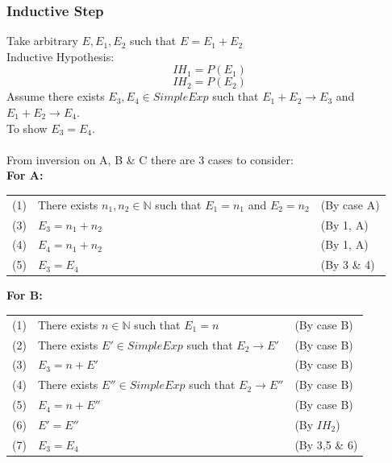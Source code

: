 \subsubsection{Inductive Step}
Take arbitrary $E, E_1,E_2$ such that $E = E_1 + E_2$
\\ Inductive Hypothesis:
\[IH_1 = P(E_1)\]
\[IH_2 = P(E_2)\]
Assume there exists $E_3, E_4 \in SimpleExp$ such that $E_1 + E_2 \to E_3$ and $E_1 + E_2 \to E_4$.
\\ To show $E_3 = E_4$.
\\
\\ From inversion on A, B \& C there are 3 cases to consider:
\\ \textbf{For A:}
\begin{center}
	\begin{tabular}{l l l}
		(1) & There exists $n_1, n_2 \in \mathbb{N}$ such that $E_1 = n_1$ and $E_2 = n_2$ & (By case A) \\
		(3) & $E_3 = n_1 + n_2$                                                            & (By 1, A)   \\
		(4) & $E_4 = n_1 + n_2$                                                            & (By 1, A)   \\
		(5) & $E_3 = E_4$                                                                  & (By 3 \& 4) \\
	\end{tabular}
\end{center}
\textbf{For B:}
\begin{center}
	\begin{tabular}{l l l}
		(1) & There exists $n \in \mathbb{N}$ such that $E_1 = n$      & (By case B)   \\
		(2) & There exists $E' \in SimpleExp$ such that $E_2 \to E'$   & (By case B)   \\
		(3) & $E_3 = n + E'$                                           & (By case B)   \\
		(4) & There exists $E'' \in SimpleExp$ such that $E_2 \to E''$ & (By case B)   \\
		(5) & $E_4 = n + E''$                                          & (By case B)   \\
		(6) & $E' = E''$                                               & (By $IH_2$)   \\
		(7) & $E_3 = E_4$                                              & (By 3,5 \& 6) \\
	\end{tabular}
\end{center}
